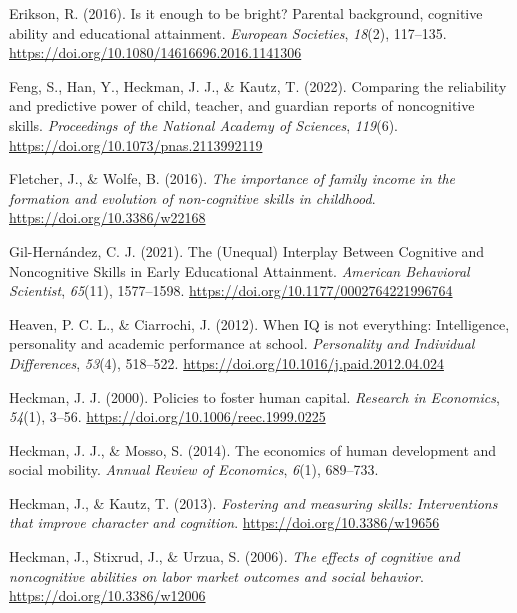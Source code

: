 \documentclass{article}
\newlength{\cslhangindent}
\newlength{\cslentryspacingunit} %
\newenvironment{CSLReferences}[2] %
 {%
  \setlength{\parindent}{0pt}
  \ifodd #1
  \let\oldpar\par
  \def\par{\hangindent=\cslhangindent\oldpar}
  \fi
  \setlength{\parskip}{#2\cslentryspacingunit}
 }%
 {}
\begin{document}
\begin{CSLReferences}{1}{0}
\leavevmode{}%
Erikson, R. (2016). Is it enough to be bright? Parental background,
cognitive ability and educational attainment. \emph{European Societies},
\emph{18}(2), 117--135.
\url{https://doi.org/10.1080/14616696.2016.1141306}

\leavevmode{}%
Feng, S., Han, Y., Heckman, J. J., \& Kautz, T. (2022). Comparing the
reliability and predictive power of child, teacher, and guardian reports
of noncognitive skills. \emph{Proceedings of the National Academy of
Sciences}, \emph{119}(6). \url{https://doi.org/10.1073/pnas.2113992119}

\leavevmode{}%
Fletcher, J., \& Wolfe, B. (2016). \emph{The importance of family income
in the formation and evolution of non-cognitive skills in childhood}.
\url{https://doi.org/10.3386/w22168}

\leavevmode{}%
Gil-Hernández, C. J. (2021). The (Unequal) Interplay Between Cognitive
and Noncognitive Skills in Early Educational Attainment. \emph{American
Behavioral Scientist}, \emph{65}(11), 1577--1598.
\url{https://doi.org/10.1177/0002764221996764}

\leavevmode{}%
Heaven, P. C. L., \& Ciarrochi, J. (2012). When IQ is not everything:
Intelligence, personality and academic performance at school.
\emph{Personality and Individual Differences}, \emph{53}(4), 518--522.
\url{https://doi.org/10.1016/j.paid.2012.04.024}

\leavevmode{}%
Heckman, J. J. (2000). Policies to foster human capital. \emph{Research
in Economics}, \emph{54}(1), 3--56.
\url{https://doi.org/10.1006/reec.1999.0225}

\leavevmode{}%
Heckman, J. J., \& Mosso, S. (2014). The economics of human development
and social mobility. \emph{Annual Review of Economics}, \emph{6}(1),
689--733.

\leavevmode{}%
Heckman, J., \& Kautz, T. (2013). \emph{Fostering and measuring skills:
Interventions that improve character and cognition}.
\url{https://doi.org/10.3386/w19656}

\leavevmode{}%
Heckman, J., Stixrud, J., \& Urzua, S. (2006). \emph{The effects of
cognitive and noncognitive abilities on labor market outcomes and social
behavior}. \url{https://doi.org/10.3386/w12006}


\end{CSLReferences}
\end{document}
